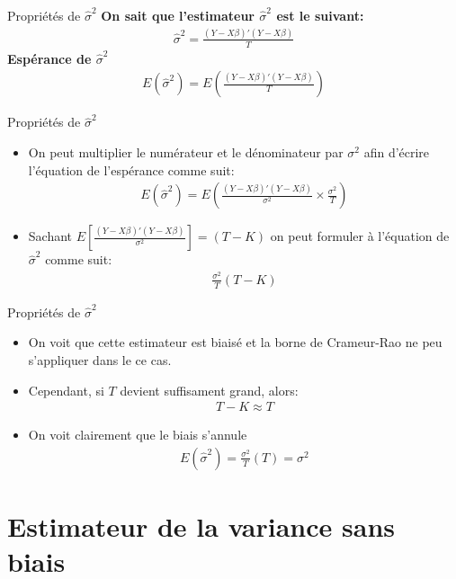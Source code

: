 \documentclass{beamer}
\begin{document}
\begin{frame}{Propriétés de $\hat{\sigma}^2$}
\textbf{On sait que l'estimateur $\hat{\sigma}^2$ est le suivant:}
\begin{align*}
\hat{\sigma}^2=\frac{(Y-X \beta)'(Y-X \beta)}{T}
\end{align*}
\textbf{Espérance de $\hat{\sigma}^2$}
\begin{align*}
E(\hat{\sigma}^2)=E \left( \frac{(Y-X \beta)'(Y-X \beta)}{T}\right)
\end{align*}
\end{frame}

\begin{frame}{Propriétés de $\hat{\sigma}^2$}
\begin{itemize}
\item On peut multiplier le numérateur et le dénominateur par $\sigma^2$ afin d'écrire l'équation de l'espérance comme suit:
\begin{align*}
E(\hat{\sigma}^2)=E \left( \frac{(Y-X \beta)'(Y-X \beta)}{\sigma^2} \times \frac{\sigma^2}{T} \right)
\end{align*}
\item Sachant $E \left[ \frac{(Y-X \beta)'(Y-X \beta)}{\sigma^2}\right]=(T-K)$ on peut formuler à l'équation de $\hat{\sigma}^2$ comme suit:
\begin{align*}
\frac{\sigma^2}{T}(T-K)
\end{align*}
\end{itemize}
\end{frame}


\begin{frame}{Propriétés de $\hat{\sigma}^2$}
\begin{itemize}
\item On voit que cette estimateur est biaisé et la borne de Crameur-Rao ne peu s'appliquer dans le ce cas.
\item Cependant, si $T$ devient suffisament grand, alors:
\begin{align*}
T-K \approx T
\end{align*}
\item On voit clairement que le biais s'annule 
\begin{align*}
E(\hat{\sigma}^2)=\frac{\sigma^2}{T}(T)=\sigma^2
\end{align*}
\end{itemize}
\end{frame}


\section{Estimateur de la variance sans biais}
\end{document}
